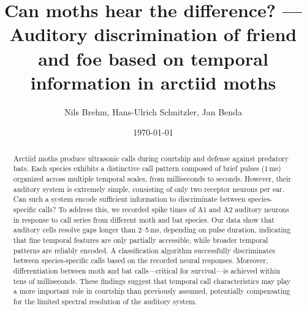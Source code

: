 \documentclass[12pt,a4paper]{article}
\title{Can moths hear the difference? --- Auditory discrimination of friend and foe based on temporal information in arctiid moths}
\author{Nils Brehm, Hans-Ulrich Schnitzler, Jan Benda}
\date{\today}
\begin{document}
\maketitle


\begin{abstract}
Arctiid moths produce ultrasonic calls during courtship and defense against predatory bats. Each species exhibits a distinctive call pattern composed of brief pulses (1\,ms) organized across multiple temporal scales, from milliseconds to seconds. However, their auditory system is extremely simple, consisting of only two receptor neurons per ear. Can such a system encode sufficient information to discriminate between species-specific calls?
To address this, we recorded spike times of A1 and A2 auditory neurons in response to call series from different moth and bat species. Our data show that auditory cells resolve gaps longer than 2--5\,ms, depending on pulse duration, indicating that fine temporal features are only partially accessible, while broader temporal patterns are reliably encoded.
A classification algorithm successfully discriminates between species-specific calls based on the recorded neural responses. Moreover, differentiation between moth and bat calls---critical for survival---is achieved within tens of milliseconds.
These findings suggest that temporal call characteristics may play a more important role in courtship than previously assumed, potentially compensating for the limited spectral resolution of the auditory system.
\end{abstract}

\newpage

\end{document}
